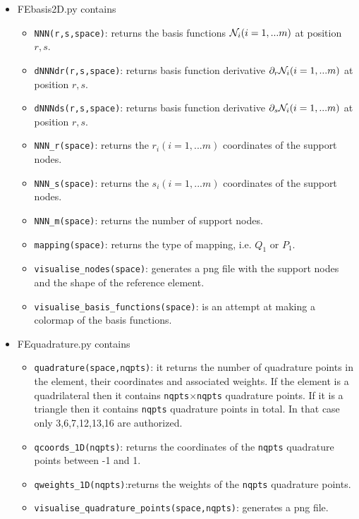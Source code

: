 \begin{itemize}

\item {\pythonfile FEbasis2D.py} contains 

\begin{itemize}
\item \lstinline{NNN(r,s,space)}: returns the basis functions ${\mathcal{N}}_i (i=1,...m)$ at position $r,s$.
\item \lstinline{dNNNdr(r,s,space)}: returns basis function derivative $\partial_r{\mathcal{N}}_i (i=1,...m)$ at position $r,s$.
\item \lstinline{dNNNds(r,s,space)}: returns basis function derivative $\partial_s{\mathcal{N}}_i (i=1,...m)$ at position $r,s$.
\item \lstinline{NNN_r(space)}: returns the $r_i (i=1,...m)$ coordinates of the support nodes.
\item \lstinline{NNN_s(space)}: returns the $s_i (i=1,...m)$ coordinates of the support nodes.
\item \lstinline{NNN_m(space)}: returns the number of support nodes.
\item \lstinline{mapping(space)}: returns the type of mapping, i.e. $Q_1$ or $P_1$.
\item \lstinline{visualise_nodes(space)}: generates a png file with the support nodes and the shape of the reference element.
\item \lstinline{visualise_basis_functions(space)}: is an attempt at making a colormap of the basis functions.
\end{itemize}


\item {\pythonfile FEquadrature.py} contains
\begin{itemize}
\item \lstinline{quadrature(space,nqpts)}: it returns the number of quadrature points in the element, 
their coordinates and associated weights. If the element is a quadrilateral then it contains 
\lstinline{nqpts}$\times$\lstinline{nqpts} quadrature points. 
If it is a triangle then it contains \lstinline{nqpts} quadrature points in total. 
In that case only 3,6,7,12,13,16 are authorized.   
\item \lstinline{qcoords_1D(nqpts)}: returns the coordinates of the \lstinline{nqpts} quadrature points between -1 and 1.
\item \lstinline{qweights_1D(nqpts)}:returns the weights of the \lstinline{nqpts} quadrature points.
\item \lstinline{visualise_quadrature_points(space,nqpts)}: generates a png file.
\end{itemize}



\end{itemize}
